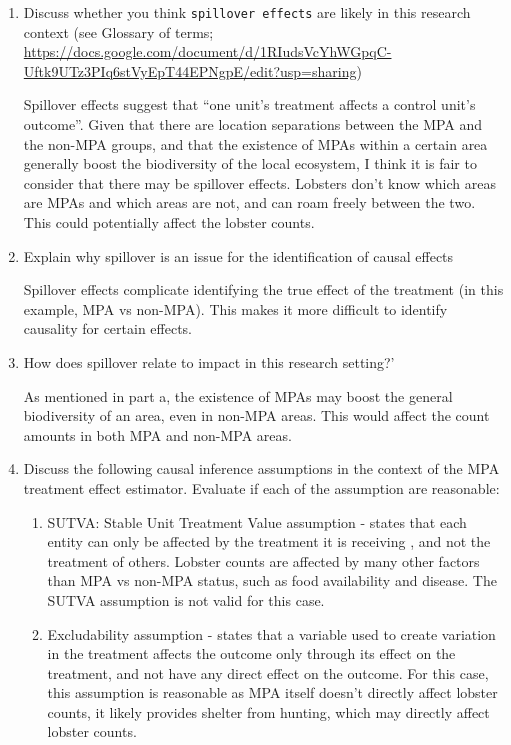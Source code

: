 \documentclass[
]{article}
\providecommand{\tightlist}{%
  \setlength{\itemsep}{0pt}\setlength{\parskip}{0pt}}
\begin{document}
\begin{enumerate}
\def\labelenumi{\alph{enumi}.}
\item
  Discuss whether you think \texttt{spillover\ effects} are likely in
  this research context (see Glossary of terms;
  \url{https://docs.google.com/document/d/1RIudsVcYhWGpqC-Uftk9UTz3PIq6stVyEpT44EPNgpE/edit?usp=sharing})

  Spillover effects suggest that ``one unit's treatment affects a
  control unit's outcome''. Given that there are location separations
  between the MPA and the non-MPA groups, and that the existence of MPAs
  within a certain area generally boost the biodiversity of the local
  ecosystem, I think it is fair to consider that there may be spillover
  effects. Lobsters don't know which areas are MPAs and which areas are
  not, and can roam freely between the two. This could potentially
  affect the lobster counts.
\item
  Explain why spillover is an issue for the identification of causal
  effects

  Spillover effects complicate identifying the true effect of the
  treatment (in this example, MPA vs non-MPA). This makes it more
  difficult to identify causality for certain effects.
\item
  How does spillover relate to impact in this research setting?'

  As mentioned in part a, the existence of MPAs may boost the general
  biodiversity of an area, even in non-MPA areas. This would affect the
  count amounts in both MPA and non-MPA areas.
\item
  Discuss the following causal inference assumptions in the context of
  the MPA treatment effect estimator. Evaluate if each of the assumption
  are reasonable:

  \begin{enumerate}
  \def\labelenumii{\arabic{enumii})}
  \tightlist
  \item
    SUTVA: Stable Unit Treatment Value assumption - states that each
    entity can only be affected by the treatment it is receiving , and
    not the treatment of others. Lobster counts are affected by many
    other factors than MPA vs non-MPA status, such as food availability
    and disease. The SUTVA assumption is not valid for this case.
  \item
    Excludability assumption - states that a variable used to create
    variation in the treatment affects the outcome only through its
    effect on the treatment, and not have any direct effect on the
    outcome. For this case, this assumption is reasonable as MPA itself
    doesn't directly affect lobster counts, it likely provides shelter
    from hunting, which may directly affect lobster counts.
  \end{enumerate}
\end{enumerate}
\end{document}
